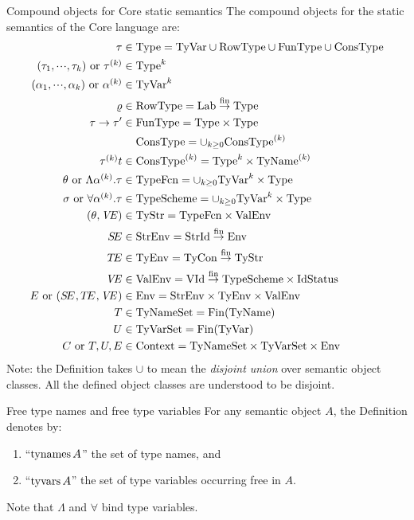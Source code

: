 \begin{clause}{Compound objects for Core static semantics}
The compound objects for the static semantics of the Core language are:
\begin{align*}
        \tau    & \in \Type = \TyVar\cup\RowType\cup\FunType\cup\ConsType\\
 \longtauk\ {\rm or}\ \tauk
                & \in  \Type^k\\
 \longalphak\ {\rm or}\ \alphak
                & \in  \TyVar^k\\
 \varrho        & \in  \RowType = \finfun{\Lab}{\Type} \\
 \tau\rightarrow\tau'
                & \in  \FunType = \Type\times\Type \\
                & \mathrel{\phantom{\in}} \ConsType = \cup_{k\geq 0}\ConsType^{(k)}\\
        \tauk t & \in  \ConsType^{(k)} = \Type^k\times\TyNamesk  \\
\typefcn\ {\rm or}\ \typefcnk
                & \in  \TypeFcn = \cup_{k\geq 0}\TyVar^k\times\Type\\
\tych\ {\rm or}\ \longtych
                & \in  \TypeScheme = \cup_{k\geq 0}\TyVar^k\times\Type\\
(\theta,\VE)    & \in  \TyStr = \TypeFcn\times\ValEnv\\
\SE             & \in  \StrEnv = \finfun{\StrId}{\Env}\\
\TE             & \in  \TyEnv = \finfun{\TyCon}{\TyStr}\\
\VE             & \in  \ValEnv = \finfun{\VId}{\TypeScheme\times\IdStatus}\\
\E\ {\rm or}\ \newlongE{}
                & \in  \Env = \StrEnv\times\TyEnv\times\ValEnv\\
\T              & \in  \TyNameSets = \Fin(\TyNames)\\
\U              & \in  \TyVarSet = \Fin(\TyVar)\\
\C\ {\rm or}\ \T,\U,\E   & \in  \Context = \TyNameSets\times\TyVarSet\times\Env
\end{align*}
Note: the Definition takes $\cup$ to mean the \emph{disjoint union} over
semantic object classes. All the defined object classes are understood
to be disjoint.
\end{clause}

\begin{definition}{Free type names and free type variables}
For any semantic object $A$, the Definition denotes by:
\begin{enumerate}
\item ``$\mathop{\rm tynames}\nolimits A$'' the set of type names, and
\item ``$\mathop{\rm tyvars}\nolimits A$'' the set of type variables occurring free in $A$.
\end{enumerate}
Note that $\Lambda$ and $\forall$ bind type variables.
\end{definition}

